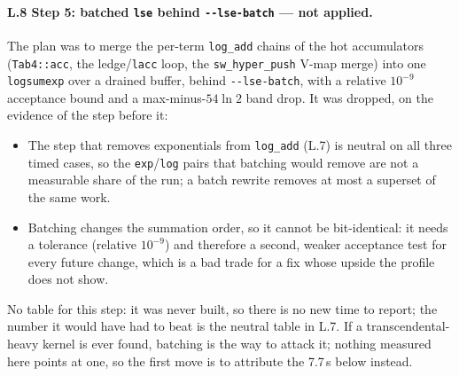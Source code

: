 \documentclass[11pt]{article}
\begin{document}
\paragraph{L.8 Step 5: batched \texttt{lse} behind \texttt{-{}-lse-batch} --- not applied.} The plan was to merge the per-term \texttt{log\_add} chains of the hot accumulators (\texttt{Tab4::acc}, the ledge/\texttt{lacc} loop, the \texttt{sw\_hyper\_push} V-map merge) into one \texttt{logsumexp} over a drained buffer, behind \texttt{-{}-lse-batch}, with a relative $10^{-9}$ acceptance bound and a max-minus-$54\ln 2$ band drop. It was dropped, on the evidence of the step before it:
\begin{itemize}[leftmargin=*]
  \item The step that removes exponentials from \texttt{log\_add} (L.7) is neutral on all three timed cases, so the \texttt{exp}/\texttt{log} pairs that batching would remove are not a measurable share of the run; a batch rewrite removes at most a superset of the same work.
  \item Batching changes the summation order, so it cannot be bit-identical: it needs a tolerance (relative $10^{-9}$) and therefore a second, weaker acceptance test for every future change, which is a bad trade for a fix whose upside the profile does not show.
\end{itemize}
No table for this step: it was never built, so there is no new time to report; the number it would have had to beat is the neutral table in L.7.
If a transcendental-heavy kernel is ever found, batching is the way to attack it; nothing measured here points at one, so the first move is to attribute the 7.7\,s below instead.
\end{document}
